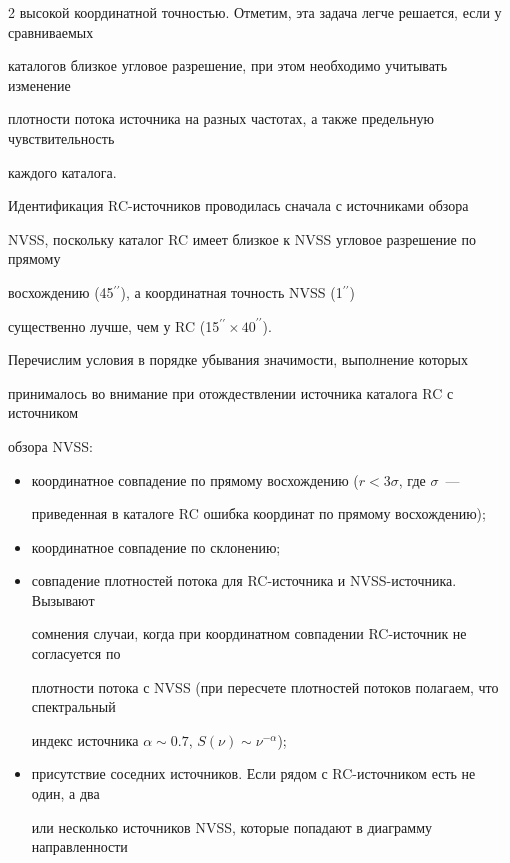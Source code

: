 \begin{multicols}{2}
высокой координатной точностью. Отметим, эта задача легче решается, если у сравниваемых 

каталогов близкое угловое разрешение, при этом необходимо учитывать изменение 

плотности потока источника на разных частотах, а также предельную чувствительность 

каждого каталога.

      

      Идентификация RC-источников проводилась сначала с источниками обзора 

NVSS, поскольку каталог RC имеет близкое к NVSS угловое разрешение по прямому 

восхождению (45$^{\prime\prime}$), а координатная точность NVSS (1$^{\prime\prime}$) 

существенно лучше, чем у RC (15$^{\prime\prime}\times40^{\prime\prime}$).

      

      Перечислим условия в порядке убывания значимости, выполнение которых 

принималось во внимание при отождествлении источника каталога RC с источником 

обзора NVSS:

\begin{itemize}

\item координатное совпадение по прямому восхождению ($r < 3\sigma$, где $\sigma$~--- 

приведенная в каталоге RC ошибка координат по прямому восхождению); 

\item координатное совпадение по склонению; 

\item совпадение плотностей потока для RC-ис\-точ\-ни\-ка и NVSS-ис\-точ\-ни\-ка. Вызывают 

сомнения случаи, когда при координатном совпадении RC-ис\-точ\-ник не согласуется по 

плотности потока с NVSS (при пересчете плотностей потоков полагаем, что спектральный 

индекс источника $\alpha\sim 0.7$, $S(\nu) \sim \nu^{-\alpha}$); 

\item присутствие соседних источников. Если рядом с RC-ис\-точ\-ни\-ком есть не один, а два 

или несколько источников NVSS, которые попадают в диаграмму направленности 


\end{itemize}
\end{multicols}
